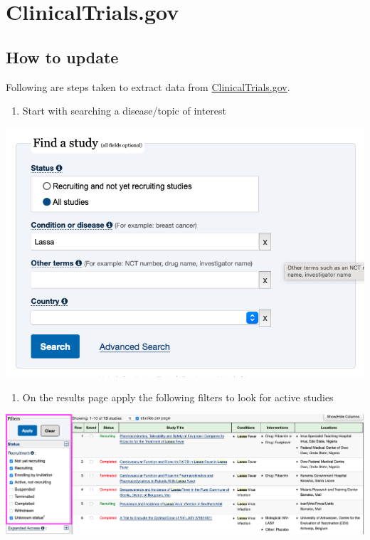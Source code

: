 \documentclass[
]{book}
\providecommand{\tightlist}{%
  \setlength{\itemsep}{0pt}\setlength{\parskip}{0pt}}
\begin{document}
\hypertarget{update-clinicaltrials}{%
\section{ClinicalTrials.gov}\label{update-clinicaltrials}}

\hypertarget{how-to-update-1}{%
\subsection{How to update}\label{how-to-update-1}}

Following are steps taken to extract data from \href{https://clinicaltrials.gov/}{ClinicalTrials.gov}.

\begin{enumerate}
\def\labelenumi{\arabic{enumi}.}
\tightlist
\item
  Start with searching a disease/topic of interest
\end{enumerate}

\includegraphics{images/clinicaltrial1.png}

\begin{enumerate}
\def\labelenumi{\arabic{enumi}.}
\setcounter{enumi}{1}
\tightlist
\item
  On the results page apply the following filters to look for active studies
\end{enumerate}

\includegraphics{images/clinicaltrial2.png}
\end{document}
